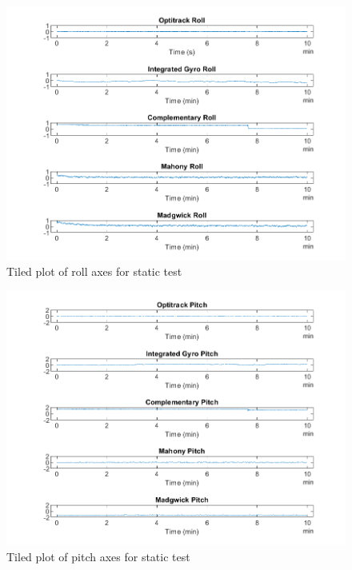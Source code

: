 \begin{figure}[H]
    \centering
    \includegraphics[scale=1]{graphics/Navigation/TiledStaticRoll.png}
    \caption{Tiled plot of roll axes for static test}
     \label{fig:Tiled plot of filters roll axes for static test}
\end{figure}

\begin{figure}[H]
    \centering
    \includegraphics[scale=1]{graphics/Navigation/TiledStaticPitch.png}
    \caption{Tiled plot of pitch axes for static test}
     \label{fig:Tiled plot of filters pitch axes for static test}
\end{figure}

